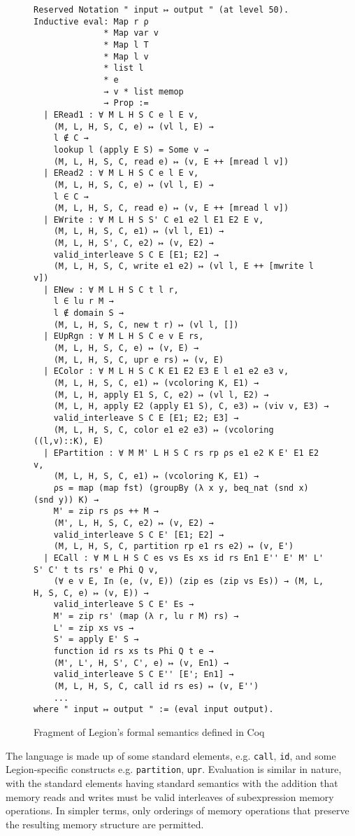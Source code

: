 \documentclass[sigconf]{acmart}
\begin{document}
\begin{figure*}
\centering
\begin{BVerbatim}
Reserved Notation " input ↦ output " (at level 50).
Inductive eval: Map r ρ 
              * Map var v
              * Map l T
              * Map l v
              * list l 
              * e 
              → v * list memop
              → Prop := 
  | ERead1 : ∀ M L H S C e l E v,
    (M, L, H, S, C, e) ↦ (vl l, E) →
    l ∉ C → 
    lookup l (apply E S) = Some v → 
    (M, L, H, S, C, read e) ↦ (v, E ++ [mread l v])
  | ERead2 : ∀ M L H S C e l E v,
    (M, L, H, S, C, e) ↦ (vl l, E) →
    l ∈ C → 
    (M, L, H, S, C, read e) ↦ (v, E ++ [mread l v]) 
  | EWrite : ∀ M L H S S' C e1 e2 l E1 E2 E v,
    (M, L, H, S, C, e1) ↦ (vl l, E1) →
    (M, L, H, S', C, e2) ↦ (v, E2) →
    valid_interleave S C E [E1; E2] →
    (M, L, H, S, C, write e1 e2) ↦ (vl l, E ++ [mwrite l v])
  | ENew : ∀ M L H S C t l r, 
    l ∈ lu r M →
    l ∉ domain S →
    (M, L, H, S, C, new t r) ↦ (vl l, [])
  | EUpRgn : ∀ M L H S C e v E rs,
    (M, L, H, S, C, e) ↦ (v, E) →
    (M, L, H, S, C, upr e rs) ↦ (v, E)
  | EColor : ∀ M L H S C K E1 E2 E3 E l e1 e2 e3 v, 
    (M, L, H, S, C, e1) ↦ (vcoloring K, E1) → 
    (M, L, H, apply E1 S, C, e2) ↦ (vl l, E2) → 
    (M, L, H, apply E2 (apply E1 S), C, e3) ↦ (viv v, E3) → 
    valid_interleave S C E [E1; E2; E3] →
    (M, L, H, S, C, color e1 e2 e3) ↦ (vcoloring ((l,v)::K), E) 
  | EPartition : ∀ M M' L H S C rs rp ρs e1 e2 K E' E1 E2 v, 
    (M, L, H, S, C, e1) ↦ (vcoloring K, E1) → 
    ρs = map (map fst) (groupBy (λ x y, beq_nat (snd x) (snd y)) K) →
    M' = zip rs ρs ++ M →  
    (M', L, H, S, C, e2) ↦ (v, E2) →
    valid_interleave S C E' [E1; E2] →
    (M, L, H, S, C, partition rp e1 rs e2) ↦ (v, E')  
  | ECall : ∀ M L H S C es vs Es xs id rs En1 E'' E' M' L' S' C' t ts rs' e Phi Q v, 
    (∀ e v E, In (e, (v, E)) (zip es (zip vs Es)) → (M, L, H, S, C, e) ↦ (v, E)) →
    valid_interleave S C E' Es →
    M' = zip rs' (map (λ r, lu r M) rs) →  
    L' = zip xs vs →
    S' = apply E' S → 
    function id rs xs ts Phi Q t e →
    (M', L', H, S', C', e) ↦ (v, En1) → 
    valid_interleave S C E'' [E'; En1] →
    (M, L, H, S, C, call id rs es) ↦ (v, E'')
    ...
where " input ↦ output " := (eval input output).
\end{BVerbatim}
\caption{Fragment of Legion's formal semantics defined in Coq}
\label{semantics}
\end{figure*}

The language is made up of some standard elements, e.g. \texttt{call},
\texttt{id}, and some Legion-specific constructs e.g. \texttt{partition},
\texttt{upr}. Evaluation is similar in nature, with the standard elements
having standard semantics with the addition that memory reads and writes must
be valid interleaves of subexpression memory operations. In simpler terms, only
orderings of memory operations that preserve the resulting memory structure are
permitted.
\end{document}
